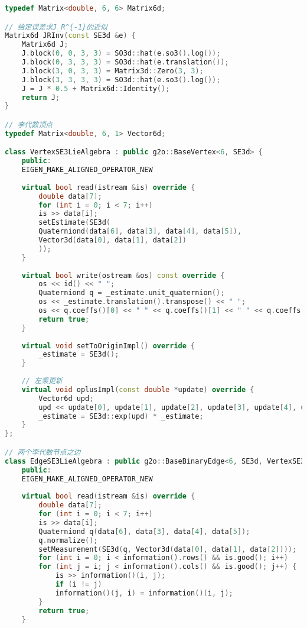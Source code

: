 \begin{lstlisting}[language=c++,caption=slambook2/ch10/pose\_graph\_g2o\_lie\_algebra.cpp（片段）]
typedef Matrix<double, 6, 6> Matrix6d;

// 给定误差求J_R^{-1}的近似
Matrix6d JRInv(const SE3d &e) {
    Matrix6d J;
    J.block(0, 0, 3, 3) = SO3d::hat(e.so3().log());
    J.block(0, 3, 3, 3) = SO3d::hat(e.translation());
    J.block(3, 0, 3, 3) = Matrix3d::Zero(3, 3);
    J.block(3, 3, 3, 3) = SO3d::hat(e.so3().log());
    J = J * 0.5 + Matrix6d::Identity();
    return J;
}

// 李代数顶点
typedef Matrix<double, 6, 1> Vector6d;

class VertexSE3LieAlgebra : public g2o::BaseVertex<6, SE3d> {
    public:
    EIGEN_MAKE_ALIGNED_OPERATOR_NEW
    
    virtual bool read(istream &is) override {
        double data[7];
        for (int i = 0; i < 7; i++)
        is >> data[i];
        setEstimate(SE3d(
        Quaterniond(data[6], data[3], data[4], data[5]),
        Vector3d(data[0], data[1], data[2])
        ));
    }
    
    virtual bool write(ostream &os) const override {
        os << id() << " ";
        Quaterniond q = _estimate.unit_quaternion();
        os << _estimate.translation().transpose() << " ";
        os << q.coeffs()[0] << " " << q.coeffs()[1] << " " << q.coeffs()[2] << " " << q.coeffs()[3] << endl;
        return true;
    }
    
    virtual void setToOriginImpl() override {
        _estimate = SE3d();
    }
    
    // 左乘更新
    virtual void oplusImpl(const double *update) override {
        Vector6d upd;
        upd << update[0], update[1], update[2], update[3], update[4], update[5];
        _estimate = SE3d::exp(upd) * _estimate;
    }
};

// 两个李代数节点之边
class EdgeSE3LieAlgebra : public g2o::BaseBinaryEdge<6, SE3d, VertexSE3LieAlgebra, VertexSE3LieAlgebra> {
    public:
    EIGEN_MAKE_ALIGNED_OPERATOR_NEW
    
    virtual bool read(istream &is) override {
        double data[7];
        for (int i = 0; i < 7; i++)
        is >> data[i];
        Quaterniond q(data[6], data[3], data[4], data[5]);
        q.normalize();
        setMeasurement(SE3d(q, Vector3d(data[0], data[1], data[2])));
        for (int i = 0; i < information().rows() && is.good(); i++)
        for (int j = i; j < information().cols() && is.good(); j++) {
            is >> information()(i, j);
            if (i != j)
            information()(j, i) = information()(i, j);
        }
        return true;
    }
    

\end{lstlisting}
